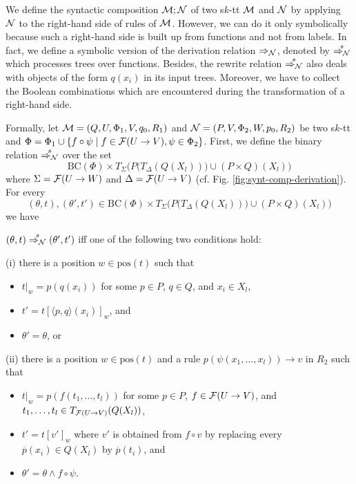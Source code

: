 \documentclass[10pt]{scrartcl}
\newcommand{\pos}{\mathrm{pos}}
\newcommand{\BC}{\mathrm{BC}}
\newcommand{\M}{{\cal M}}
\newcommand{\N}{{\cal N}}
\newcommand{\F}{{\cal F}}
\begin{document}
We define the syntactic composition $\M;\N$ of two s$k$-tt $\M$ and $\N$ by applying $\N$ to the right-hand side of rules of $\M$. However, we can do it only symbolically because such a right-hand side is built up from functions and not from labels. In fact, we define a symbolic version of the derivation relation $\Rightarrow_{\N}$, denoted by $\stackrel{s}{\Rightarrow_{\N}}$ which processes trees over functions. Besides, the rewrite relation $\stackrel{s}{\Rightarrow_{\N}}$ also deals with objects of the form $q(x_i)$ in its input trees. Moreover, we have to collect the Boolean combinations which are encountered during the transformation of a right-hand side. 



Formally, let $\M = (Q,U,\Phi_1,V,q_{0},R_1)$ and 
$\N = (P,V,\Phi_2,W,p_{0},R_2)$ be two s$k$-tt and
$\Phi = \Phi_1 \cup \{f \circ \psi \mid f \in \F(U\rightarrow V), \psi \in \Phi_2\}$. First, we define the binary relation $\stackrel{s}{\Rightarrow_{\N}}$ over the set
\[
 \BC\left(\Phi\right)\times
T_\Sigma\Big(P\big(T_\Delta\left(Q\left(X_l\right)\right)\big)\cup (P\times Q)\left(X_l\right)\Big)
\]
where $\Sigma = \F(U\rightarrow W)$ and
$\Delta = \F(U\rightarrow V)$ (cf. Fig. \ref{fig:synt-comp-derivation}).  For every 
\[(\theta,t), (\theta',t') \in \BC\left(\Phi\right)\times
T_\Sigma\Big(P\big(T_\Delta\left(Q\left(X_l\right)\right)\big)\cup (P\times Q)\left(X_l\right)\Big)\] we have 

$(\theta,t) \stackrel{s}{\Rightarrow_{\N}} (\theta',t')$  iff one of the following two conditions hold:

(i) there is a position $w \in \pos(t)$ such that 
\begin{itemize}
\item $t|_w = p(q(x_i))$ for some $p \in P$, $q \in Q$, and $x_i \in X_l$,
\item $t' = t[\langle p,q\rangle(x_i)]_w$, and 
\item $\theta' = \theta$, or
\end{itemize}

(ii) there is a position $w \in \pos(t)$ and a rule $p(\psi(x_1,\ldots,x_l))\rightarrow v$ in $R_2$ such that 
\begin{itemize}
\item $t|_w = p(f(t_1,\ldots,t_l))$ for some $p \in P$, $f \in \F(U\rightarrow V)$,  and $t_1,\ldots,t_l \in T_{\F(U\rightarrow V)}(Q(X_l))$,
\item $t' = t[v']_w$ where $v'$ is obtained from $f \circ v$ by  replacing every $\overline{p}(x_i) \in Q(X_l)$ by $\overline{p}(t_i)$, and
\item $\theta' = \theta \wedge f \circ \psi$. 
\end{itemize}
\end{document}
